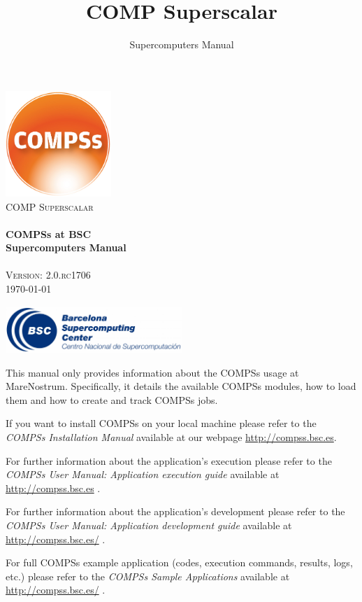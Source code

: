 \documentclass[a4paper,12pt]{article}
\title{COMP Superscalar}
\author{Supercomputers Manual}
\def \compssversion {2.0.rc1706}
\begin{document}
  \hypersetup{pageanchor=false}
  \begin{titlepage} 
    \begin{center} 
      \includegraphics[width=0.3\textwidth]{./Figures/Logos/degradado-naranja-compss.jpg}~\\[1cm] 
      \textsc{\LARGE COMP Superscalar}\\[1.5cm] 
      
      \HRule \\[0.4cm] 
      { \huge \bfseries COMPSs at BSC \\[0.4cm] }
      { \large \bfseries Supercomputers Manual \\[0.4cm] } 
      \HRule \\[1.5cm] 

      { \large \textsc{Version: \compssversion}} \\[0.3cm]
      { \large \today } 
      
      \vfill 
      \includegraphics[width=0.5\textwidth]{./Figures/bsc_280.jpg}~\\[1cm]
    \end{center} 
  \end{titlepage}
  \hypersetup{pageanchor=true}
  
  {
    This manual only provides information about the COMPSs usage at MareNostrum. Specifically, it details the available COMPSs modules,
    how to load them and how to create and track COMPSs jobs. 
    \newline
    
    If you want to install COMPSs on your local machine please refer to the \textit{COMPSs Installation Manual} available at our
    webpage \url{http://compss.bsc.es}.
    
    For further information about the application's execution please refer to the \textit{COMPSs User Manual: Application execution
    guide} available at \url{http://compss.bsc.es} .
    
    For further information about the application's development please refer to the \textit{COMPSs User Manual: Application development
    guide} available at \url{http://compss.bsc.es/} .
    
    For full COMPSs example application (codes, execution commands, results, logs, etc.) please refer to the \textit{COMPSs Sample 
    Applications} available at \url{http://compss.bsc.es/} .
  }
  
\end{document}
